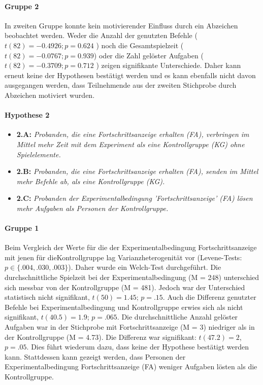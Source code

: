 \paragraph{Gruppe 2}
In zweiten Gruppe konnte kein motivierender Einfluss durch ein Abzeichen beobachtet werden. Weder die Anzahl der genutzten Befehle ( $ t(82)=-0.4926; p=0.624 $ ) noch die Gesamtspielzeit ($t(82)=-0.0767; p=0.939$) oder die Zahl gelöster Aufgaben ( $t(82)=-0.3709; p=0.712$ ) zeigen signifikante Unterschiede. Daher kann erneut keine der Hypothesen bestätigt werden und es kann ebenfalls nicht davon ausgegangen werden, dass Teilnehmende aus der zweiten Stichprobe durch Abzeichen motiviert wurden. 


\paragraph{Hypothese 2}
\begin{itemize}
    \item \textbf{2.A:} \textit{Probanden, die eine Fortschrittsanzeige erhalten (FA), verbringen im Mittel mehr Zeit mit dem Experiment als eine Kontrollgruppe (KG) ohne Spielelemente.}
    \item \textbf{2.B:} \textit{Probanden, die eine Fortschrittsanzeige erhalten (FA), senden im Mittel mehr Befehle ab, als eine Kontrollgruppe (KG).}
    \item \textbf{2.C:} \textit{Probanden der Experimentalbedingung 'Fortschrittsanzeige' (FA) lösen mehr Aufgaben als Personen der Kontrollgruppe.} 
\end{itemize}

\paragraph{Gruppe 1}
Beim Vergleich der Werte für die der Experimentalbedingung Fortschrittsanzeige mit jenen für dieKontrollgruppe lag Varianzheterogenität vor (Levene-Tests: $p\in\{.004, .030, .003\}$). Daher wurde ein Welch-Test durchgeführt. Die durchschnittliche Spielzeit bei der Experimentalbedingung (M = 248) unterschied sich messbar von der Kontrollgruppe (M = 481). Jedoch war der Unterschied statistisch nicht signifikant, $t(50) = 1.45$; $p = .15$. Auch die Differenz genutzter Befehle bei Experimentalbedingung und Kontrollgruppe erwies sich als nicht signifikant, $t(40.5)=1.9$; $p=.065$. Die durchschnittliche Anzahl gelöster Aufgaben war in der Stichprobe mit Fortschrittsanzeige (M = 3) niedriger als in der Kontrollgruppe (M = 4.73). Die Differenz war signifikant: $t(47.2) = 2$, $p = .05$. Dies führt wiederum dazu, dass keine der Hypothese bestätigt werden kann. Stattdessen kann gezeigt werden, dass Personen der Experimentalbedingung Fortschrittsanzeige (FA) weniger Aufgaben lösten als die Kontrollgruppe. 


